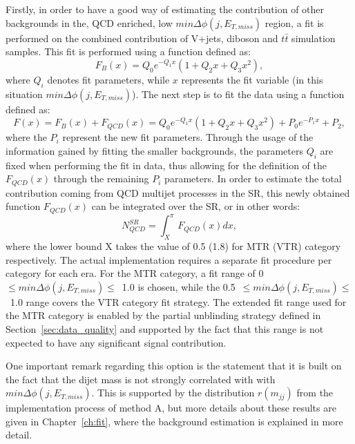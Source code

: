 \hspace{10pt} Firstly, in order to have a good way of estimating the contribution of other backgrounds in the, QCD enriched, low $min\Delta\phi(j, E_{T, miss})$ region, a fit is performed on the combined contribution of V+jets, diboson and $t\bar{t}$ simulation samples. This fit is performed using a function defined as:
\begin{equation}
    F_B(x)  = Q_0e^{-Q_1x}(1+Q_2x+Q_3x^2),
\end{equation}
where $Q_i$ denotes fit parameters, while $x$ represents the fit variable (in this situation $min\Delta\phi(j, E_{T, miss})$). The next step is to fit the data using a function defined as:
\begin{equation}
    F(x) = F_B(x)+F_{QCD}(x) = Q_0e^{-Q_1x}(1+Q_2x+Q_3x^2)+P_0e^{-P_1x}+P_2,
\end{equation}
where the $P_i$ represent the new fit parameters. Through the usage of the information gained by fitting the smaller backgrounds, the parameters $Q_i$ are fixed when performing the fit in data, thus allowing for the definition of the $F_{QCD}(x)$ through the remaining $P_i$ parameters. In order to estimate the total contribution coming from QCD multijet processes in the SR, this newly obtained function $F_{QCD}(x)$ can be integrated over the SR, or in other words:
\begin{equation}
    N_{QCD}^{SR} = \int_X^{\pi}F_{QCD}(x)dx,
\end{equation}
where the lower bound X takes the value of 0.5 (1.8) for MTR (VTR) category respectively. The actual implementation requires a separate fit procedure per category for each era. For the MTR category, a fit range of 0~$\leq min\Delta\phi(j,E_{T,miss})\leq$~1.0 is chosen, while the 0.5~$\leq min\Delta\phi(j,E_{T,miss})\leq$~1.0 range covers the VTR category fit strategy. The extended fit range used for the MTR category is enabled by the partial unblinding strategy defined in Section~\ref{sec:data_quality} and supported by the fact that this range is not expected to have any significant signal contribution.

\hspace{10pt} One important remark regarding this option is the statement that it is built on the fact that the dijet mass is not strongly correlated with with $min\Delta\phi(j,E_{T,miss})$. This is supported by the distribution $r(m_{jj})$ from the implementation process of method A, but more details about these results are given in Chapter~\ref{ch:fit}, where the background estimation is explained in more detail.

